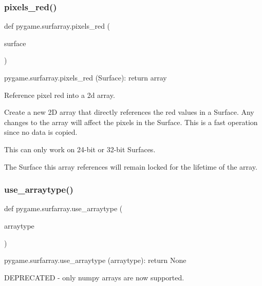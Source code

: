 \subsubsection{\texorpdfstring{pixels\+\_\+red()}{pixels\_red()}}
{\footnotesize\ttfamily def pygame.\+surfarray.\+pixels\+\_\+red (\begin{DoxyParamCaption}\item[{}]{surface }\end{DoxyParamCaption})}

\begin{DoxyVerb}pygame.surfarray.pixels_red (Surface): return array

Reference pixel red into a 2d array.

Create a new 2D array that directly references the red values
in a Surface. Any changes to the array will affect the pixels
in the Surface. This is a fast operation since no data is copied.

This can only work on 24-bit or 32-bit Surfaces.

The Surface this array references will remain locked for the
lifetime of the array.
\end{DoxyVerb}
 \mbox{\label{namespacepygame_1_1surfarray_a01dea8427ceac95151f6535ba151bb6b}} 
\subsubsection{\texorpdfstring{use\+\_\+arraytype()}{use\_arraytype()}}
{\footnotesize\ttfamily def pygame.\+surfarray.\+use\+\_\+arraytype (\begin{DoxyParamCaption}\item[{}]{arraytype }\end{DoxyParamCaption})}

\begin{DoxyVerb}pygame.surfarray.use_arraytype (arraytype): return None

DEPRECATED - only numpy arrays are now supported.
\end{DoxyVerb}
 